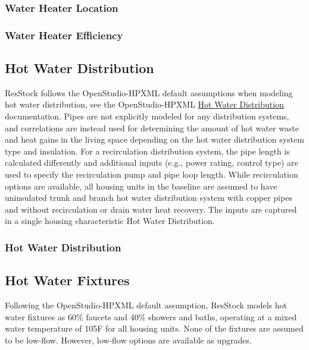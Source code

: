 \subsubsection{Water Heater Location}\label{water_heater_location}


\subsubsection{Water Heater Efficiency}\label{water_heater_efficiency}


\subsection{Hot Water Distribution}
ResStock follows the OpenStudio-HPXML default assumptions when modeling hot water distribution, see the OpenStudio-HPXML \href{https://openstudio-hpxml.readthedocs.io/en/v1.10.0/workflow_inputs.html#hpxml-hot-water-distribution}{Hot Water Distribution} documentation. Pipes are not explicitly modeled for any distribution systems, and correlations are instead used for determining the amount of hot water waste and heat gains in the living space depending on  the hot water distribution system type and insulation. For a recirculation distribution system, the pipe length is calculated differently and additional inputs (e.g., power rating, control type) are used to specify the recirculation pump and pipe loop length. While recirculation options are available, all housing units in the baseline are assumed to have uninsulated trunk and branch hot water distribution system with copper pipes and without recirculation or drain water heat recovery. The inputs are captured in a single housing characteristic Hot Water Distribution.

\subsubsection{Hot Water Distribution}\label{hot_water_distribution}


\subsection{Hot Water Fixtures}
Following the OpenStudio-HPXML default assumption, ResStock models hot water fixtures as 60\% faucets and 40\% showers and baths, operating at a mixed water temperature of 105\degree F for all housing units. None of the fixtures are assumed to be low-flow. However, low-flow options are available as upgrades.

